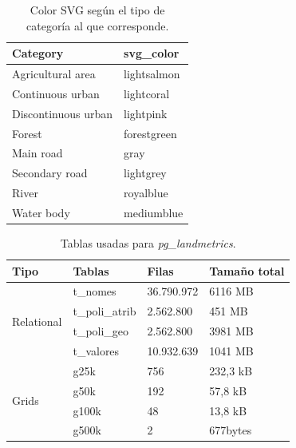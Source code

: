 \begin{table}[]
\centering
\caption{Color SVG según el tipo de categoría al que corresponde.}
\label{my-label}
\begin{tabular}{ll}
\hline
\textbf{Category}   & \textbf{svg\_color} \\ \hline
Agricultural area   & lightsalmon         \\
Continuous urban    & lightcoral          \\
Discontinuous urban & lightpink           \\
Forest              & forestgreen         \\
Main road           & gray                \\
Secondary road      & lightgrey           \\
River               & royalblue           \\
Water body          & mediumblue          \\ \hline
\end{tabular}
\end{table}



\begin{table}[]
\centering
\caption{Tablas usadas para \textit{pg\_landmetrics}.}
\label{my-label}
\begin{tabular}{@{}llll@{}}
\toprule
\textbf{Tipo}               & \textbf{Tablas} & \textbf{Filas} & \textbf{Tamaño total} \\ \midrule
\multirow{4}{*}{Relational} & t\_nomes        & 36.790.972     & 6116 MB               \\
                            & t\_poli\_atrib  & 2.562.800      & 451 MB                \\
                            & t\_poli\_geo    & 2.562.800      & 3981 MB               \\
                            & t\_valores      & 10.932.639     & 1041 MB               \\ \midrule
\multirow{4}{*}{Grids}      & g25k            & 756            & 232,3 kB              \\
                            & g50k            & 192            & 57,8 kB               \\
                            & g100k           & 48             & 13,8 kB               \\
                            & g500k           & 2              & 677bytes              \\ \bottomrule
\end{tabular}
\end{table}





